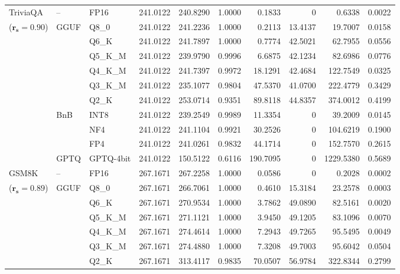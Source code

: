 \begin{longtable}{ll l rrrrrrr}
\midrule
TriviaQA & -- & FP16 & 241.0122 & 240.8290 & 1.0000 & 0.1833 & \cellcolor{cyan!12} $0$ & 0.6338 & 0.0022 \\
{\small ($\mathbf{r_s{=}0.90}$)} & GGUF & Q8\_0 & 241.0122 & 241.2236 & 1.0000 & 0.2113 & 13.4137 & 19.7007 & 0.0158 \\
 &  & Q6\_K & 241.0122 & 241.7897 & 1.0000 & 0.7774 & 42.5021 & 62.7955 & 0.0556 \\
 &  & Q5\_K\_M & 241.0122 & 239.9790 & 0.9996 & 6.6875 & 42.1234 & 82.6986 & 0.0776 \\
 &  & Q4\_K\_M & 241.0122 & 241.7397 & 0.9972 & 18.1291 & 42.4684 & 122.7549 & 0.0325 \\
 &  & Q3\_K\_M & 241.0122 & 235.1077 & 0.9804 & 47.5370 & 41.0700 & 222.4779 & 0.3429 \\
 &  & Q2\_K & 241.0122 & 253.0714 & \cellcolor{red!18} 0.9351 & \cellcolor{red!18} 89.8118 & 44.8357 & \cellcolor{red!18} 374.0012 & \cellcolor{red!18} 0.4199 \\
 & BnB & INT8 & 241.0122 & 239.2549 & 0.9989 & 11.3354 & \cellcolor{cyan!12} $0$ & 39.2009 & 0.0145 \\
 &  & NF4 & 241.0122 & 241.1104 & 0.9921 & 30.2526 & \cellcolor{cyan!12} $0$ & 104.6219 & 0.1900 \\
 &  & FP4 & 241.0122 & 241.0261 & 0.9832 & 44.1714 & \cellcolor{cyan!12} $0$ & 152.7570 & 0.2615 \\
 & GPTQ & GPTQ-4bit & 241.0122 & 150.5122 & \cellcolor{red!35} 0.6116 & \cellcolor{red!35} 190.7095 & \cellcolor{cyan!12} $0$ & \cellcolor{red!35} 1229.5380 & \cellcolor{red!35} 0.5689 \\
\midrule
GSM8K & -- & FP16 & 267.1671 & 267.2258 & 1.0000 & 0.0586 & \cellcolor{cyan!12} $0$ & 0.2028 & 0.0002 \\
{\small ($\mathbf{r_s{=}0.89}$)} & GGUF & Q8\_0 & 267.1671 & 266.7061 & 1.0000 & 0.4610 & 15.3184 & 23.2578 & 0.0003 \\
 &  & Q6\_K & 267.1671 & 270.9534 & 1.0000 & 3.7862 & 49.0890 & 82.5161 & 0.0020 \\
 &  & Q5\_K\_M & 267.1671 & 271.1121 & 1.0000 & 3.9450 & 49.1205 & 83.1096 & 0.0070 \\
 &  & Q4\_K\_M & 267.1671 & 274.4614 & 1.0000 & 7.2943 & 49.7265 & 95.5495 & 0.0049 \\
 &  & Q3\_K\_M & 267.1671 & 274.4880 & 1.0000 & 7.3208 & 49.7003 & 95.6042 & 0.0504 \\
 &  & Q2\_K & 267.1671 & 313.4117 & 0.9835 & 70.0507 & 56.9784 & 322.8344 & 0.2799 \\

\end{longtable}
